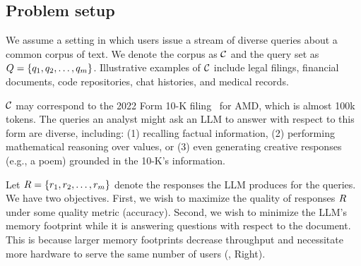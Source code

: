 
\vspace{-2mm}
\vspace{-1mm}
\subsection{Problem setup}\label{sec:problem-setup}
We assume a setting in which users issue a stream of diverse queries about a common corpus of text. We denote the corpus as $\mathcal{C}$ and the query set as $Q = \{q_1, q_2,\hdots,q_m\}$. Illustrative examples of $\mathcal{C}$ include legal filings, financial documents, code repositories, chat histories, and medical records.
\begin{examplebox}
    $\mathcal{C}$ may correspond to the 2022 Form 10-K filing~\cite{sec_read10k} for AMD, which is almost 100k tokens. The queries an analyst might ask an LLM to answer with respect to this form are diverse, including: (1) recalling factual information, (2) performing mathematical reasoning over values, or (3) even generating creative responses (e.g., a poem) grounded in the 10-K's information.
\end{examplebox}
Let $R = \{r_1, r_2,\hdots,r_m\}$ denote the responses the LLM produces for the queries. We have two objectives. First, we wish to maximize the quality of responses $R$ under some quality metric (\eg accuracy). Second, we wish to minimize the LLM's memory footprint while it is answering questions with respect to the document. This is because larger memory footprints decrease throughput and necessitate more hardware to serve the same number of users (, Right).
\vspace{-2mm}

